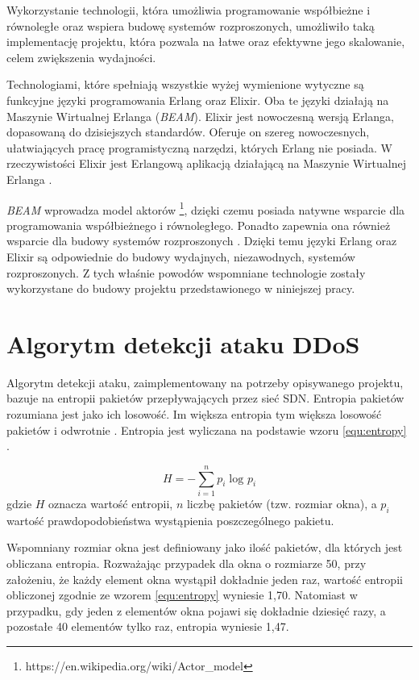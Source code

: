 Wykorzystanie technologii, która umożliwia programowanie współbieżne i
równoległe oraz wspiera budowę systemów rozproszonych, umożliwiło taką
implementację projektu, która pozwala na łatwe oraz efektywne jego skalowanie,
celem zwiększenia wydajności.

Technologiami, które spełniają wszystkie wyżej wymienione wytyczne są funkcyjne
języki programowania Erlang oraz Elixir. Oba te języki działają na Maszynie
Wirtualnej Erlanga (\textit{BEAM}). Elixir jest nowoczesną wersją
Erlanga, dopasowaną do dzisiejszych standardów. Oferuje on szereg nowoczesnych,
ułatwiających pracę programistyczną narzędzi, których Erlang nie posiada. W
rzeczywistości Elixir jest Erlangową aplikacją działającą na Maszynie Wirtualnej
Erlanga \cite{thebeambook}.

\textit{BEAM} wprowadza model aktorów
\footnote{https://en.wikipedia.org/wiki/Actor\_model}, dzięki czemu posiada
natywne wsparcie dla programowania współbieżnego i równoległego. Ponadto
zapewnia ona również wsparcie dla budowy systemów rozproszonych
\cite{lyserlang}. Dzięki temu języki Erlang oraz Elixir są odpowiednie do budowy
wydajnych, niezawodnych, systemów rozproszonych. Z tych właśnie powodów
wspomniane technologie zostały wykorzystane do budowy projektu przedstawionego w
niniejszej pracy.

\section{Algorytm detekcji ataku DDoS} \label{algorithm}

Algorytm detekcji ataku, zaimplementowany na potrzeby opisywanego projektu,
bazuje na entropii pakietów przepływających przez sieć SDN. Entropia pakietów
rozumiana jest jako ich losowość. Im większa entropia tym większa losowość
pakietów i odwrotnie \cite{mainddosarticle}. Entropia jest wyliczana na
podstawie wzoru \ref{equ:entropy} \cite{mainddosarticle}.

\begin{equation}
H = -\sum_{i=1}^{n}p_{i}\log_{}p_{i}
\label{equ:entropy}
\end{equation}
gdzie $H$ oznacza wartość entropii, $n$ liczbę pakietów (tzw. rozmiar okna),
a $p_{i}$ wartość prawdopodobieństwa wystąpienia poszczególnego pakietu.

Wspomniany rozmiar okna jest definiowany jako ilość pakietów, dla których
jest obliczana entropia. Rozważając przypadek dla okna o rozmiarze 50, przy
założeniu, że każdy element okna wystąpił dokładnie jeden raz, wartość entropii
obliczonej zgodnie ze wzorem \ref{equ:entropy} wyniesie 1,70. Natomiast w
przypadku, gdy jeden z elementów okna pojawi się dokładnie dziesięć razy, a
pozostałe 40 elementów tylko raz, entropia wyniesie 1,47.

